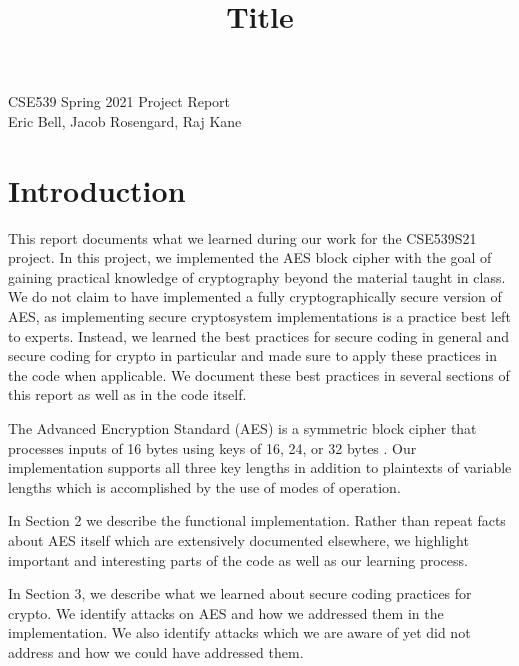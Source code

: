 \documentclass[a4paper,12pt]{article}
\title{\vspace{-40pt} Title}
\begin{document}
\vspace{-45pt}
\begin{titlepage}
    \begin{center}
        \vspace*{5cm}%
        {\LARGE CSE539 Spring 2021 Project Report}\\[1cm]
        {\normalsize Eric Bell, Jacob Rosengard, Raj Kane}\\[0.5cm]
    \end{center}
    \let\newpage\relax%
\end{titlepage}
\newpage
\tableofcontents
\clearpage


\section{Introduction}

This report documents what we learned during our work for the CSE539S21 project. In this project, we implemented the AES block cipher with the goal of gaining practical knowledge of cryptography beyond the material taught in class. We do not claim to have implemented a fully cryptographically secure version of AES, as implementing secure cryptosystem implementations is a practice best left to experts. Instead, we learned the best practices for secure coding in general and secure coding for crypto in particular and made sure to apply these practices in the code when applicable. We document these best practices in several sections of this report as well as in the code itself.

The Advanced Encryption Standard (AES) is a symmetric block cipher that processes inputs of 16 bytes using keys of 16, 24, or 32 bytes \cite{AES}. Our implementation supports all three key lengths in addition to plaintexts of variable lengths which is accomplished by the use of modes of operation.

In Section 2 we describe the functional implementation. Rather than repeat facts about AES itself which are extensively documented elsewhere, we highlight important and interesting parts of the code as well as our learning process.

In Section 3, we describe what we learned about secure coding practices for crypto. We identify attacks on AES and how we addressed them in the implementation. We also identify attacks which we are aware of yet did not address and how we could have addressed them.
\end{document}
